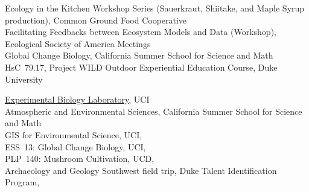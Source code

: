 \documentclass{xetexCV}
\begin{document}
 \newpage
{}

 Ecology in the Kitchen Workshop Series (Sauerkraut, Shiitake, and Maple Syrup production), Common Ground Food Cooperative\\

Facilitating Feedbacks between Ecosystem Models and Data (Workshop), Ecological Society of America Meetings\\

 Global Change Biology, California Summer School for Science and Math \\

 HsC~79.17, Project WILD Outdoor Experiential Education Course, Duke University\\


\href{https://sites.google.com/site/bio100lwlab14/}{Experimental Biology Laboratory}, UCI 
\\

Atmospheric and Environmental Sciences,  California Summer School for Science and Math\\

GIS for Environmental Science, UCI, \\

ESS~13: Global Change Biology, UCI, \\

PLP~140: Mushroom Cultivation, UCD, \\

Archaeology and Geology Southwest field trip, Duke Talent Identification Program, \\
\end{document}
